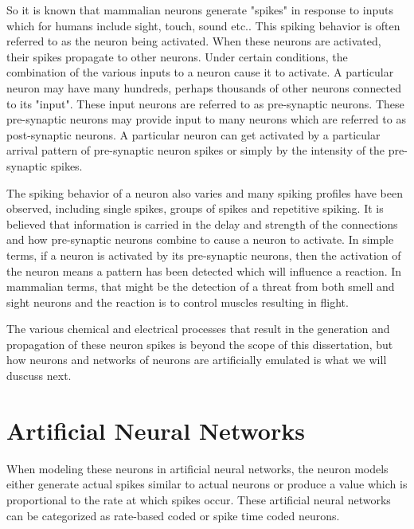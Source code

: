 \iftrue
So it is known that mammalian neurons generate "spikes" in response to inputs which for humans include sight, touch, sound etc.. This spiking behavior is often referred to as the neuron being activated.
When these neurons are activated, their spikes propagate to other neurons. Under certain conditions, the combination of the various inputs to a neuron cause it to activate. 
A particular neuron may have many hundreds, perhaps thousands of other neurons connected to its "input".
These input neurons are referred to as pre-synaptic neurons. These pre-synaptic neurons may provide input to many neurons which are referred to as post-synaptic neurons.
A particular neuron can get activated by a particular arrival pattern of pre-synaptic neuron spikes or simply by the intensity of the pre-synaptic spikes. 

The spiking behavior of a neuron also varies and many spiking profiles have been observed, including single spikes, groups of spikes and repetitive spiking. 
It is believed that information is carried in the delay and strength of the connections and how pre-synaptic neurons combine to cause a neuron to activate.
In simple terms, if a neuron is activated by its pre-synaptic neurons, then the activation of the neuron means a pattern has been detected which will influence a reaction.
In mammalian terms, that might be the detection of a threat from both smell and sight neurons and the reaction is to control muscles resulting in flight.


The various chemical and electrical processes that result in the generation and propagation of these neuron spikes is beyond the scope of this dissertation, but how neurons and networks of neurons are artificially emulated is what we will duscuss next.


\section[Artificial Neural Networks]{Artificial Neural Networks}
\label{sec:Artificial Neural Networks}

When modeling these neurons in artificial neural networks, the neuron models either generate actual spikes similar to actual neurons or
produce a value which is proportional to the rate at which spikes occur.
These artificial neural networks can be categorized as rate-based coded or spike time coded neurons.


